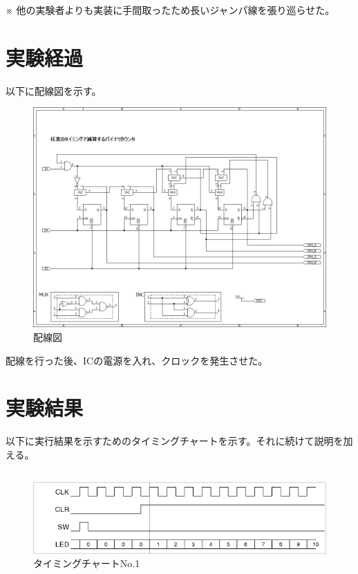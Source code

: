 \documentclass{scrartcl}
\begin{document}
※ 他の実験者よりも実装に手間取ったため長いジャンパ線を張り巡らせた。\\

\section{実験経過}
\label{sec:org631d581}

以下に配線図を示す。\\
\begin{figure}[htbp]
\centering
\includegraphics[width=.9\linewidth]{./logicex-2.png}
\caption{\label{fig:org8d59624}
配線図}
\end{figure}
配線を行った後、ICの電源を入れ、クロックを発生させた。\\

\section{実験結果}
\label{sec:orgd80c142}
以下に実行結果を示すためのタイミングチャートを示す。それに続けて説明を加える。\\

\subsection{}
\label{sec:orgf67805d}
\begin{figure}[htbp]
\centering
\includegraphics[width=.9\linewidth]{./logic-1.png}
\caption{\label{fig:org68bbc61}
タイミングチャートNo.1}
\end{figure}
\end{document}

